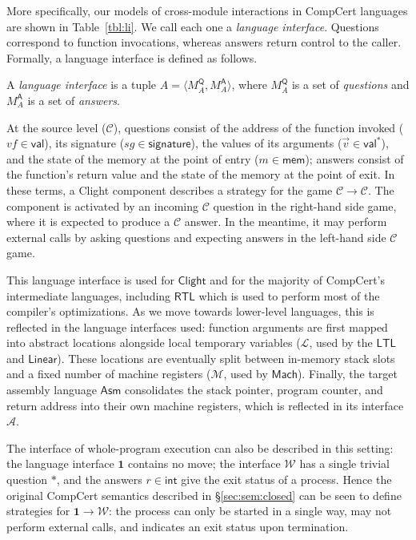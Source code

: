 \documentclass[sigplan,10pt,review,anonymous]{acmart}
\newcommand{\kw}[1]{\ensuremath{ \mathsf{#1} }}
\begin{document}
More specifically,
our models of cross-module interactions in CompCert languages
are shown in Table~\ref{tbl:li}.
We call each one a \emph{language interface}.
Questions correspond to function invocations,
whereas answers return control to the caller.
Formally,
a language interface is defined as follows.

\begin{definition}
A \emph{language interface} is a tuple
$A = \langle M_A^\kw{Q}, M_A^\kw{A} \rangle$, where
$M_A^\kw{Q}$ is a set of \emph{questions} and
$M_A^\kw{A}$ is a set of \emph{answers}.
\end{definition}

At the source level ($\mathcal{C}$),
questions consist of
the address of the function invoked
($\mathit{vf} \in \kw{val}$),
its signature
($\mathit{sg} \in \kw{signature}$),
the values of its arguments
($\vec{v} \in \kw{val}^*$),
and the state of the memory at the point of entry
($m \in \kw{mem}$);
answers
consist of the function's return value
and the state of the memory at the point of exit.
In these terms,
a Clight component describes a strategy for the game
$\mathcal{C} \rightarrow \mathcal{C}$.
The component is activated by an incoming $\mathcal{C}$ question
in the right-hand side game,
where it is expected to produce a $\mathcal{C}$ answer.
In the meantime,
it may perform external calls by
asking questions and expecting answers
in the left-hand side $\mathcal{C}$ game.

This language interface is used for \kw{Clight} and
for the majority of CompCert's intermediate languages,
including \kw{RTL} which is used to perform
most of the compiler's optimizations.
As we move towards lower-level languages,
this is reflected in the language interfaces used:
function arguments are first mapped into
abstract locations alongside local temporary variables
($\mathcal{L}$, used by the \kw{LTL} and \kw{Linear}).
These locations are eventually split between
in-memory stack slots and a fixed number of machine registers
($\mathcal{M}$, used by \kw{Mach}).
Finally, the target assembly language \kw{Asm}
consolidates the stack pointer, program counter,
and return address into their own machine registers,
which is reflected in its interface $\mathcal{A}$.

The interface of whole-program execution
can also be described in this setting:
the language interface $\mathbf{1}$ contains no move;
the interface $\mathcal{W}$ has a single trivial question $*$,
and the answers $r \in \kw{int}$
give the exit status of a process.
Hence the original CompCert semantics described in
\S\ref{sec:sem:closed}
can be seen to define strategies for
$\mathbf{1} \rightarrow \mathcal{W}$:
the process can only be started in a single way,
may not perform external calls,
and indicates an exit status upon termination.
\end{document}
